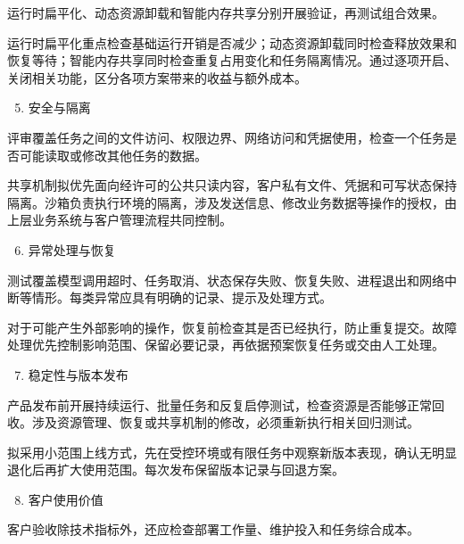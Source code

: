 运行时扁平化、动态资源卸载和智能内存共享分别开展验证，再测试组合效果。

运行时扁平化重点检查基础运行开销是否减少；动态资源卸载同时检查释放效果和恢复等待；智能内存共享同时检查重复占用变化和任务隔离情况。通过逐项开启、关闭相关功能，区分各项方案带来的收益与额外成本。

\begin{enumerate}

\setcounter{enumi}{4}
\item
  安全与隔离
\end{enumerate}

评审覆盖任务之间的文件访问、权限边界、网络访问和凭据使用，检查一个任务是否可能读取或修改其他任务的数据。

共享机制拟优先面向经许可的公共只读内容，客户私有文件、凭据和可写状态保持隔离。沙箱负责执行环境的隔离，涉及发送信息、修改业务数据等操作的授权，由上层业务系统与客户管理流程共同控制。

\begin{enumerate}

\setcounter{enumi}{5}
\item
  异常处理与恢复
\end{enumerate}

测试覆盖模型调用超时、任务取消、状态保存失败、恢复失败、进程退出和网络中断等情形。每类异常应具有明确的记录、提示及处理方式。

对于可能产生外部影响的操作，恢复前检查其是否已经执行，防止重复提交。故障处理优先控制影响范围、保留必要记录，再依据预案恢复任务或交由人工处理。

\begin{enumerate}

\setcounter{enumi}{6}
\item
  稳定性与版本发布
\end{enumerate}

产品发布前开展持续运行、批量任务和反复启停测试，检查资源是否能够正常回收。涉及资源管理、恢复或共享机制的修改，必须重新执行相关回归测试。

拟采用小范围上线方式，先在受控环境或有限任务中观察新版本表现，确认无明显退化后再扩大使用范围。每次发布保留版本记录与回退方案。

\begin{enumerate}

\setcounter{enumi}{7}
\item
  客户使用价值
\end{enumerate}

客户验收除技术指标外，还应检查部署工作量、维护投入和任务综合成本。

